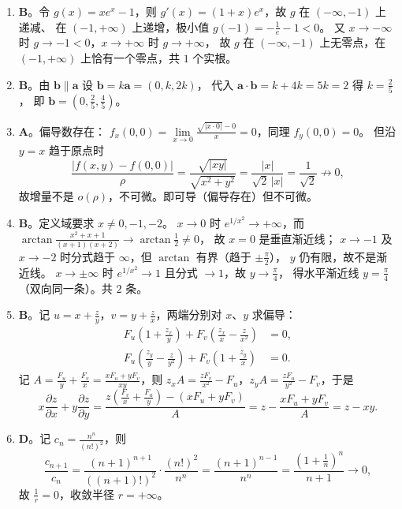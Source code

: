 \begin{enumerate}
{\begin{enumerate}
	\item
	\textbf{B}。令 $g(x)=xe^x-1$，则 $g'(x)=(1+x)e^x$，故 $g$ 在 $(-\infty,-1)$ 上递减、
	在 $(-1,+\infty)$ 上递增，极小值 $g(-1)=-\frac{1}{e}-1<0$。
	又 $x\to-\infty$ 时 $g\to-1<0$，$x\to+\infty$ 时 $g\to+\infty$，
	故 $g$ 在 $(-\infty,-1)$ 上无零点，在 $(-1,+\infty)$ 上恰有一个零点，共 $1$ 个实根。

	\item
	\textbf{B}。由 $\bm{b}\parallel\bm{a}$ 设 $\bm{b}=k\bm{a}=(0,k,2k)$，
	代入 $\bm{a}\cdot\bm{b}=k+4k=5k=2$ 得 $k=\frac{2}{5}$，
	即 $\bm{b}=\left(0,\frac{2}{5},\frac{4}{5}\right)$。

	\item
	\textbf{A}。偏导数存在：
	$f_x(0,0)=\lim\limits_{x\to0}\frac{\sqrt{|x\cdot0|}-0}{x}=0$，同理 $f_y(0,0)=0$。
	但沿 $y=x$ 趋于原点时
	\[
	\frac{\left|f(x,y)-f(0,0)\right|}{\rho}=\frac{\sqrt{|xy|}}{\sqrt{x^2+y^2}}
	=\frac{|x|}{\sqrt{2}\,|x|}=\frac{1}{\sqrt{2}}\not\to0 ,
	\]
	故增量不是 $o(\rho)$，不可微。即可导（偏导存在）但不可微。

	\item
	\textbf{B}。定义域要求 $x\neq0,-1,-2$。
	$x\to0$ 时 $e^{1/x^2}\to+\infty$，而 $\arctan\frac{x^2+x+1}{(x+1)(x+2)}\to\arctan\frac12\neq0$，
	故 $x=0$ 是垂直渐近线；
	$x\to-1$ 及 $x\to-2$ 时分式趋于 $\infty$，但 $\arctan$ 有界（趋于 $\pm\frac{\pi}{2}$），
	$y$ 仍有限，故不是渐近线。
	$x\to\pm\infty$ 时 $e^{1/x^2}\to1$ 且分式 $\to1$，故 $y\to\frac{\pi}{4}$，
	得水平渐近线 $y=\frac{\pi}{4}$（双向同一条）。共 $2$ 条。

	\item
	\textbf{B}。记 $u=x+\frac{z}{y}$，$v=y+\frac{z}{x}$，两端分别对 $x$、$y$ 求偏导：
	\begin{align*}
	F_u\left(1+\frac{z_x}{y}\right)+F_v\left(\frac{z_x}{x}-\frac{z}{x^2}\right)&=0,\\
	F_u\left(\frac{z_y}{y}-\frac{z}{y^2}\right)+F_v\left(1+\frac{z_y}{x}\right)&=0.
	\end{align*}
	记 $A=\frac{F_u}{y}+\frac{F_v}{x}=\frac{xF_u+yF_v}{xy}$，则
	$z_xA=\frac{zF_v}{x^2}-F_u$，$z_yA=\frac{zF_u}{y^2}-F_v$，于是
	\[
	x\frac{\partial z}{\partial x}+y\frac{\partial z}{\partial y}
	=\frac{z\left(\frac{F_v}{x}+\frac{F_u}{y}\right)-\left(xF_u+yF_v\right)}{A}
	=z-\frac{xF_u+yF_v}{A}=z-xy .
	\]

	\item
	\textbf{D}。记 $c_n=\frac{n^n}{(n!)^2}$，则
	\[
	\frac{c_{n+1}}{c_n}=\frac{(n+1)^{n+1}}{\left((n+1)!\right)^2}\cdot\frac{(n!)^2}{n^n}
	=\frac{(n+1)^{n-1}}{n^n}=\frac{\left(1+\frac1n\right)^n}{n+1}\longrightarrow0 ,
	\]
	故 $\frac1r=0$，收敛半径 $r=+\infty$。


\end{enumerate}}
\end{enumerate}
